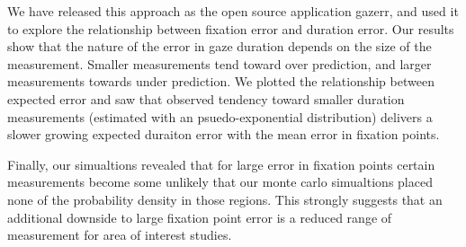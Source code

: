 \documentclass[12pt,a4paper]{article}
\numberwithin{equation}{section}
\begin{document}
We have released this approach as the open source application gazerr, and used it to explore
the relationship between fixation error and duration error. Our results show that the nature
of the error in gaze duration depends on the size of the measurement. Smaller measurements
tend toward over prediction, and larger measurements towards under prediction. We plotted
the relationship between expected error and saw that observed tendency toward smaller duration
measurements (estimated with an psuedo-exponential distribution) delivers a slower growing
expected duraiton error with the mean error in fixation points.

Finally, our simualtions revealed that for large error in fixation points certain measurements
become some unlikely that our monte carlo simualtions placed none of the probability density
in those regions. This strongly suggests that an additional downside to large fixation point error
is a reduced range of measurement for area of interest studies.





\end{document}
